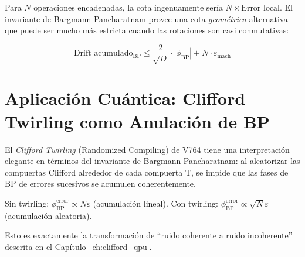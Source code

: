 Para $N$ operaciones encadenadas, la cota ingenuamente sería $N \times \text{Error local}$.
El invariante de Bargmann-Pancharatnam provee una cota \textit{geométrica} alternativa
que puede ser mucho más estricta cuando las rotaciones son casi conmutativas:

\begin{equation}
\text{Drift acumulado}_{\text{BP}} \le \frac{2}{\sqrt{D}} \cdot |\phi_{\text{BP}}| + N \cdot \varepsilon_{\text{mach}}
\end{equation}

\section{Aplicación Cuántica: Clifford Twirling como Anulación de BP}

El \textit{Clifford Twirling} (Randomized Compiling) de V764 tiene una interpretación
elegante en términos del invariante de Bargmann-Pancharatnam: al aleatorizar las
compuertas Clifford alrededor de cada compuerta T, se impide que las fases de BP
de errores sucesivos se acumulen coherentemente.

Sin twirling: $\phi_{\text{BP}}^{\text{error}} \propto N\varepsilon$ (acumulación lineal).
Con twirling: $\phi_{\text{BP}}^{\text{error}} \propto \sqrt{N}\varepsilon$ (acumulación aleatoria).

Esto es exactamente la transformación de ``ruido coherente a ruido incoherente'' descrita
en el Capítulo~\ref{ch:clifford_qpu}.
